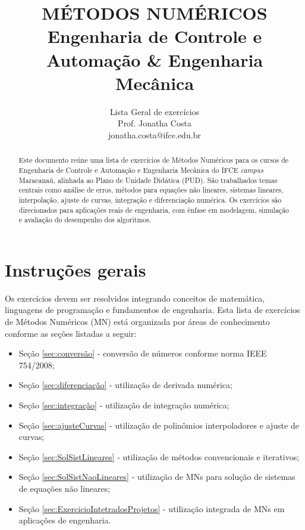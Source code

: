\documentclass[12pt]{elsarticle}
\begin{document}
\begin{frontmatter}
	\title{\bf MÉTODOS NUMÉRICOS\\
	\textnormal{\normalsize Engenharia de Controle e Automação \& Engenharia Mecânica}
}
\author{
	\vspace{-0.5cm}
	\textnormal{
		Lista Geral de exercícios\\
		Prof. Jonatha Costa\\
		jonatha.costa@ifce.edu.br}
		\vspace{-1.25cm} %
	}
	\begin{abstract} 
Este documento reúne uma lista de exercícios de Métodos Numéricos para os cursos de Engenharia de Controle e Automação e Engenharia Mecânica do IFCE \textit{campus} Maracanaú,
alinhada ao Plano de Unidade Didática (PUD). São trabalhados temas centrais como análise de erros, métodos para equações não lineares, sistemas lineares, interpolação,
ajuste de curvas, integração e diferenciação numérica. Os exercícios são direcionados para aplicações reais de engenharia, com ênfase em modelagem,
simulação e avaliação do desempenho dos algoritmos. 
\end{abstract}
	
\end{frontmatter}
\section*{Instruções gerais}

Os exercícios devem ser resolvidos integrando conceitos de matemática, linguagens de programação e fundamentos de engenharia.
Esta lista de exercícios de Métodos Numéricos (MN) está organizada por áreas de conhecimento conforme as seções listadas a seguir:

\begin{itemize}
	\item Seção \ref{sec:conversão} - conversão de números conforme norma IEEE 754/2008;
	\item Seção \ref{sec:diferenciação} - utilização de derivada numérica;
	\item Seção \ref{sec:integração} - utilização de integração numérica; 
	\item Seção \ref{sec:ajusteCurvas} - utilização de polinômios interpoladores e ajuste  de curvas;
	\item Seção \ref{sec:SolSistLineares} - utilização de métodos convencionais e iterativos;
	\item Seção \ref{sec:SolSistNaoLineares} - utilização de MNs para solução de sistemas de equações não lineares;
	\item Seção \ref{sec:ExercicioIntetradosProjetos} - utilização integrada de MNs em aplicações de engenharia.

\end{itemize}
\end{document}
